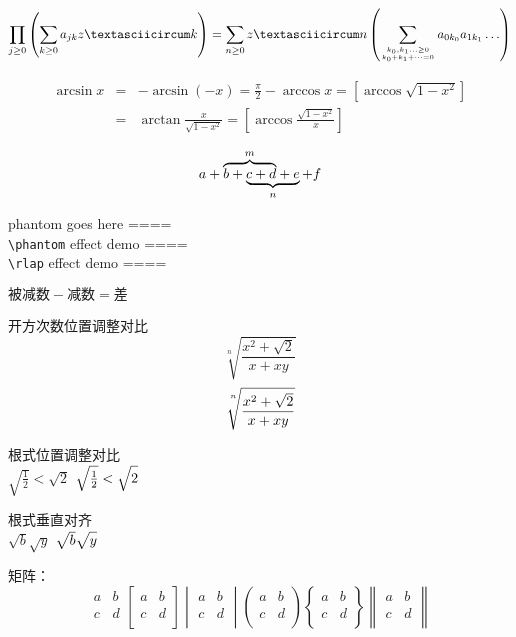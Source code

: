 \documentclass{article}
\begin{document}
    \[
        \prod_{j\ge0}\left( \sum_{k\ge0} a_{jk}zˆk \right) = \sum_{n\ge0} zˆn \left(\sum_{k_0,k_1\ldots\ge0 \atop k_0+k_1+\cdots=0} a_{0k_0} a_{1k_1}\ldots \right)
    \]

    \begin{eqnarray}
        \arcsin{x} & = & -\arcsin(-x)=\frac{\pi}{2} - \arccos x=\left [\arccos\sqrt{1-x^2}\right] \nonumber \\
                   & = & \arctan\frac{x}{\sqrt{1-x^2}} = \left [\arccos \frac{\sqrt{1-x^2}}{x}\right]
    \end{eqnarray}

    \[
        a+\rlap{$\overbrace{\phantom{b+c+d}}^m$} b+ \underbrace{c+d+e}_n +f
    \]

 
   phantom goes here  ====\\
   \verb=\phantom= effect demo \phantom{||}====\\
   \verb=\rlap= effect demo \rlap{||}====

   $\text{被减数} - \text{减数} = \text{差}$
 
   开方次数位置调整对比\\
   \[
       \sqrt[n]{\frac{x^2+\sqrt{2}}{x+xy}}
   \]
   \[
       \sqrt[\uproot{12}\leftroot{-2}n]{\frac{x^2+\sqrt{2}}{x+xy}}
   \]

   根式位置调整对比\\
   $\sqrt{\frac 12} < \sqrt{2}$ \qquad
   $\sqrt{\frac 12} < \sqrt{\vphantom{\frac 12}2}$

   根式垂直对齐\\
   $\sqrt b \sqrt y$ \qquad $\sqrt{\mathstrut b} \sqrt{\mathstrut y}$

   矩阵：
   \[
       \begin{matrix}
        a & b \\
        c & d \\
       \end{matrix}
       \begin{bmatrix}
        a & b \\
        c & d \\
       \end{bmatrix}
       \begin{vmatrix}
        a & b \\
        c & d \\
       \end{vmatrix}
       \begin{pmatrix}
        a & b \\
        c & d \\
       \end{pmatrix}
       \begin{Bmatrix}
        a & b \\
        c & d \\
       \end{Bmatrix}
       \begin{Vmatrix}
        a & b \\
        c & d \\
       \end{Vmatrix}
   \]
\end{document}
